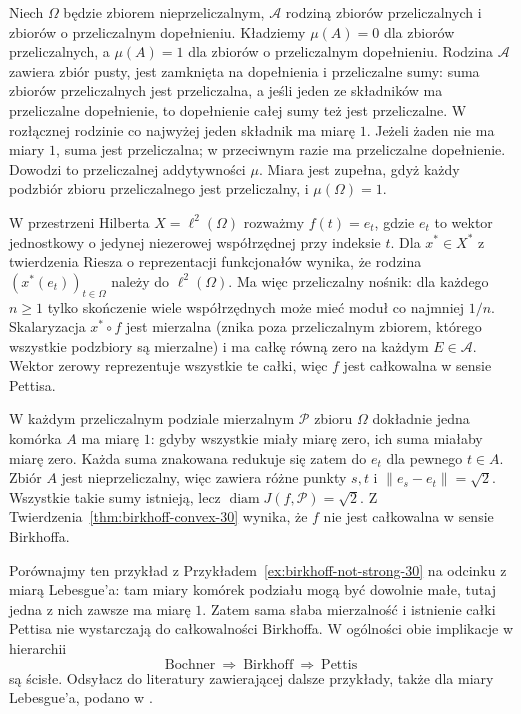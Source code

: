 \begin{przyklad}
\label{ex:pettis-not-birkhoff-30}
Niech $\Omega$ będzie zbiorem nieprzeliczalnym,
$\mathcal A$ rodziną zbiorów przeliczalnych i zbiorów
o przeliczalnym dopełnieniu. Kładziemy $\mu(A)=0$
dla zbiorów przeliczalnych, a $\mu(A)=1$ dla
zbiorów o przeliczalnym dopełnieniu.
Rodzina $\mathcal A$ zawiera zbiór pusty, jest
zamknięta na dopełnienia i przeliczalne sumy:
suma zbiorów przeliczalnych jest przeliczalna,
a jeśli jeden ze składników ma przeliczalne
dopełnienie, to dopełnienie całej sumy też
jest przeliczalne. W rozłącznej rodzinie
co najwyżej jeden składnik ma miarę $1$.
Jeżeli żaden nie ma miary $1$, suma jest przeliczalna;
w przeciwnym razie ma przeliczalne dopełnienie.
Dowodzi to przeliczalnej addytywności $\mu$.
Miara jest zupełna, gdyż każdy podzbiór zbioru
przeliczalnego jest przeliczalny, i $\mu(\Omega)=1$.

W przestrzeni Hilberta $X=\ell^2(\Omega)$ rozważmy
$f(t)=e_t$, gdzie $e_t$ to wektor jednostkowy
o jedynej niezerowej współrzędnej przy indeksie $t$.
Dla $x^*\in X^*$ z twierdzenia Riesza o reprezentacji
funkcjonałów wynika, że rodzina $(x^*(e_t))_{t\in\Omega}$
należy do $\ell^2(\Omega)$. Ma więc przeliczalny nośnik:
dla każdego $n\ge1$ tylko skończenie wiele współrzędnych
może mieć moduł co najmniej $1/n$.
Skalaryzacja $x^*\circ f$ jest mierzalna (znika poza
przeliczalnym zbiorem, którego wszystkie podzbiory
są mierzalne) i ma całkę równą zero na każdym
$E\in\mathcal A$. Wektor zerowy reprezentuje
wszystkie te całki, więc $f$ jest całkowalna
w sensie Pettisa.

W każdym przeliczalnym podziale mierzalnym
$\mathcal P$ zbioru $\Omega$ dokładnie jedna komórka
$A$ ma miarę $1$: gdyby wszystkie miały miarę zero,
ich suma miałaby miarę zero. Każda suma znakowana
redukuje się zatem do $e_t$ dla pewnego $t\in A$.
Zbiór $A$ jest nieprzeliczalny, więc zawiera
różne punkty $s,t$ i $\|e_s-e_t\|=\sqrt2$.
Wszystkie takie sumy istnieją, lecz
$\operatorname{diam}J(f,\mathcal P)=\sqrt2$.
Z Twierdzenia~\ref{thm:birkhoff-convex-30}
wynika, że $f$ nie jest całkowalna w sensie Birkhoffa.
\end{przyklad}

Porównajmy ten przykład z Przykładem~\ref{ex:birkhoff-not-strong-30}
na odcinku z miarą Lebesgue'a: tam miary komórek
podziału mogą być dowolnie małe, tutaj jedna z nich
zawsze ma miarę $1$. Zatem sama słaba mierzalność
i istnienie całki Pettisa nie wystarczają do
całkowalności Birkhoffa. W ogólności obie implikacje
w hierarchii
\[
 \text{Bochner}\ \Longrightarrow\ \text{Birkhoff}\
 \Longrightarrow\ \text{Pettis}
\]
są ścisłe. Odsyłacz do literatury zawierającej dalsze przykłady,
także dla miary Lebesgue'a, podano w
.

